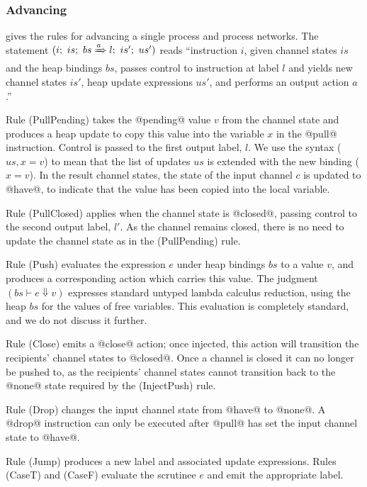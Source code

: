 


\subsubsection{Advancing}
 gives the rules for advancing a single process and process networks.
The statement $(i;~is;~bs \xRightarrow{a} l;~is';~us')$ reads ``instruction $i$, given channel states $is$ and the heap bindings $bs$, passes control to instruction at label $l$ and yields new channel states $is'$, heap update expressions $us'$, and performs an output action $a$.''

Rule (PullPending) takes the @pending@ value $v$ from the channel state and produces a heap update to copy this value into the variable $x$ in the @pull@ instruction.
Control is passed to the first output label, $l$.
We use the syntax ($us,x=v$) to mean that the list of updates $us$ is extended with the new binding ($x=v$).
In the result channel states, the state of the input channel $c$ is updated to @have@, to indicate that the value has been copied into the local variable.

Rule (PullClosed) applies when the channel state is @closed@, passing control to the second output label, $l'$.
As the channel remains closed, there is no need to update the channel state as in the (PullPending) rule.

Rule (Push) evaluates the expression $e$ under heap bindings $bs$ to a value $v$, and produces a corresponding action which carries this value.
The judgment $(bs \vdash e \Downarrow v)$ expresses standard untyped lambda calculus reduction, using the heap $bs$ for the values of free variables.
This evaluation is completely standard, and we do not discuss it further.

Rule (Close) emits a @close@ action; once injected, this action will transition the recipients' channel states to @closed@.
Once a channel is closed it can no longer be pushed to, as the recipients' channel states cannot transition back to the @none@ state required by the (InjectPush) rule.

Rule (Drop) changes the input channel state from @have@ to @none@. A @drop@ instruction can only be executed after @pull@ has set the input channel state to @have@.

Rule (Jump) produces a new label and associated update expressions. Rules (CaseT) and (CaseF) evaluate the scrutinee $e$ and emit the appropriate label.


